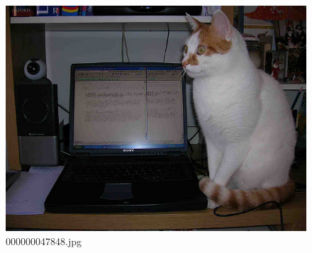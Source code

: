     \begin{figure}[h]
        \centering
        \includegraphics[width=0.8\linewidth]{../image set/easy/000000047848.jpg}
        \caption{000000047848.jpg}
    \end{figure}
